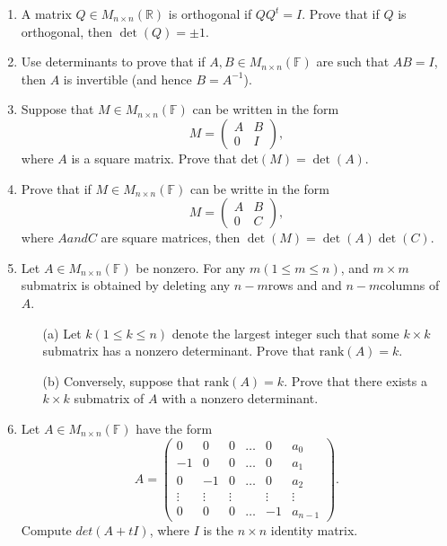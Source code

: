 \begin{enumerate}
    \item A matrix \(Q \in M_{n \times n}(\mathbb{R})\) is orthogonal if \(QQ^t = I\). Prove that if \(Q\) is orthogonal, then \(\det (Q) = \pm 1\). \vspace{3cm}
    \item Use determinants to prove that if \(A,B \in M_{n \times n}(\mathbb{F})\) are such that \(AB = I\), then \(A\) is invertible (and hence \(B = A^{-1}\)). \vspace{3cm}
    \item Suppose that \(M \in M_{n \times n}(\mathbb{F})\) can be written in the form \[ M = \begin{pmatrix}
        A & B \\
        0 & I
    \end{pmatrix},\] where \(A\) is a square matrix. Prove that det\((M) = \det(A)\). \vspace{5cm}
    \item Prove that if \(M \in M_{n \times n}(\mathbb{F})\) can be writte in the form \[ M = \begin{pmatrix}
        A & B \\
        0 & C
        \end{pmatrix},\] where \(A and C\) are square matrices, then \(\det (M) = \det (A) \det (C)\). \vspace{5cm}
    \item Let \(A \in M_{n \times n}(\mathbb{F})\) be nonzero. For any \(m (1 \leq m \leq n)\), and \(m \times m \) submatrix is obtained by deleting any \(n-m\)rows and and \(n-m\)columns of \(A\).
    \begin{enumerate}
        \item[(a)] Let \(k (1 \leq k \leq n)\) denote the largest integer such that some \(k \times k\) submatrix has a nonzero determinant. Prove that \(\text{rank}(A) = k\).
        \item[(b)] Conversely, suppose that \(\text{rank}(A) = k\). Prove that there exists a \(k \times k\) submatrix of \(A\) with a nonzero determinant.
    \end{enumerate}
    \vspace{5cm}
    \item Let \(A \in M_{n \times n}(\mathbb{F})\) have the form \[ A = \begin{pmatrix}
        0 &0& 0& \dots & 0& a_0 \\
        -1& 0& 0 &\dots & 0 &a_1 \\
        0 &-1& 0& \dots & 0& a_2 \\
        \vdots& \vdots& \vdots & & \vdots & \vdots \\
        0 &0 &0 &\dots& -1 & a_{n-1}
        \end{pmatrix}.\] Compute \(det(A+tI)\), where \(I\) is the \(n \times n\) identity matrix. \vspace{5cm}
\end{enumerate}


